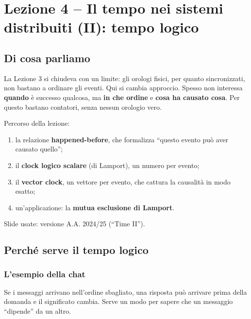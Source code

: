\chapter{Lezione 4 -- Il tempo nei sistemi distribuiti (II): tempo logico}

\section{Di cosa parliamo}

La Lezione 3 si chiudeva con un limite: gli orologi fisici, per quanto sincronizzati, non bastano a ordinare gli eventi. Qui si cambia approccio. Spesso non interessa \textbf{quando} è successo qualcosa, ma \textbf{in che ordine} e \textbf{cosa ha causato cosa}. Per questo bastano contatori, senza nessun orologio vero.

Percorso della lezione:

\begin{enumerate}
\def\labelenumi{\arabic{enumi}.}
\tightlist
\item
  la relazione \textbf{happened-before}, che formalizza ``questo evento può aver causato quello'';
\item
  il \textbf{clock logico scalare} (di Lamport), un numero per evento;
\item
  il \textbf{vector clock}, un vettore per evento, che cattura la causalità in modo esatto;
\item
  un'applicazione: la \textbf{mutua esclusione di Lamport}.
\end{enumerate}

Slide usate: versione A.A. 2024/25 (``Time II'').

\section{Perché serve il tempo logico}

\subsection{L'esempio della chat}

\begin{inbreve}

Se i messaggi arrivano nell'ordine sbagliato, una risposta può arrivare prima della domanda e il significato cambia. Serve un modo per sapere che un messaggio ``dipende'' da un altro.

\end{inbreve}

